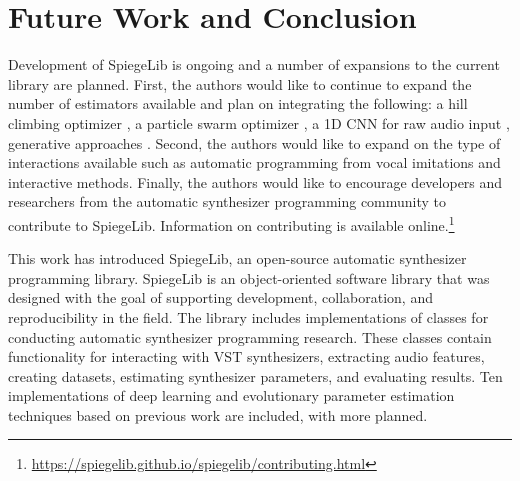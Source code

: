 \section{Future Work and Conclusion}
Development of SpiegeLib is ongoing and a number of expansions to the current library are planned. First, the authors would like to continue to expand the number of estimators available and plan on integrating the following: a hill climbing optimizer \cite{yee2018automatic}, a particle swarm optimizer \cite{heise2009automatic}, a 1D CNN for raw audio input \cite{barkan2019inversynth}, generative approaches \cite{esling2020flow, le2021improving}.  Second, the authors would like to expand on the type of interactions available such as automatic programming from vocal imitations \cite{mcartwright2014} and interactive methods. 
Finally, the authors would like to encourage developers and researchers from the automatic synthesizer programming community to contribute to SpiegeLib. Information on contributing is available online.\footnote{\url{https://spiegelib.github.io/spiegelib/contributing.html}} 

This work has introduced SpiegeLib, an open-source automatic synthesizer programming library. SpiegeLib is an object-oriented software library that was designed with the goal of supporting development, collaboration, and reproducibility in the field. The library includes implementations of classes for conducting automatic synthesizer programming research. These classes contain functionality for interacting with VST synthesizers, extracting audio features, creating datasets, estimating synthesizer parameters, and evaluating results. Ten implementations of deep learning and evolutionary parameter estimation techniques based on previous work are included, with more planned.